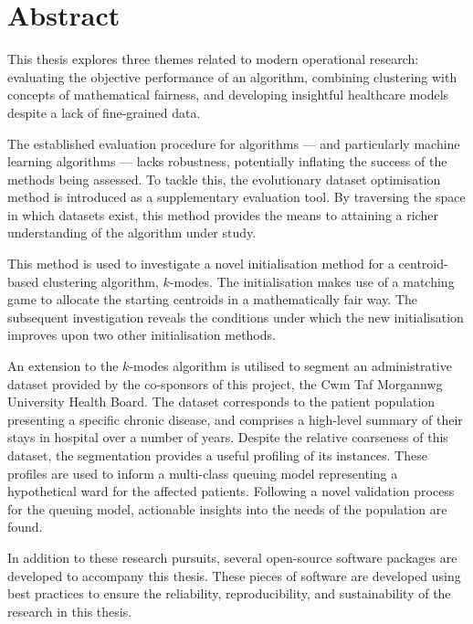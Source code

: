 \chapter*{Abstract}

This thesis explores three themes related to modern operational research:
evaluating the objective performance of an algorithm, combining clustering with
concepts of mathematical fairness, and developing insightful healthcare models
despite a lack of fine-grained data.

The established evaluation procedure for algorithms --- and particularly machine
learning algorithms --- lacks robustness, potentially inflating the success of
the methods being assessed. To tackle this, the evolutionary dataset
optimisation method is introduced as a supplementary evaluation tool. By
traversing the space in which datasets exist, this method provides the means to
attaining a richer understanding of the algorithm under study.

This method is used to investigate a novel initialisation method for a
centroid-based clustering algorithm, \(k\)-modes. The initialisation makes use
of a matching game to allocate the starting centroids in a mathematically fair
way. The subsequent investigation reveals the conditions under which the new
initialisation improves upon two other initialisation methods.

An extension to the \(k\)-modes algorithm is utilised to segment an
administrative dataset provided by the co-sponsors of this project, the Cwm Taf
Morgannwg University Health Board. The dataset corresponds to the patient
population presenting a specific chronic disease, and comprises a high-level
summary of their stays in hospital over a number of years. Despite the relative
coarseness of this dataset, the segmentation provides a useful profiling of its
instances. These profiles are used to inform a multi-class queuing model
representing a hypothetical ward for the affected patients. Following a novel
validation process for the queuing model, actionable insights into the needs of
the population are found.

In addition to these research pursuits, several open-source software packages
are developed to accompany this thesis. These pieces of software are developed
using best practices to ensure the reliability, reproducibility, and
sustainability of the research in this thesis.
